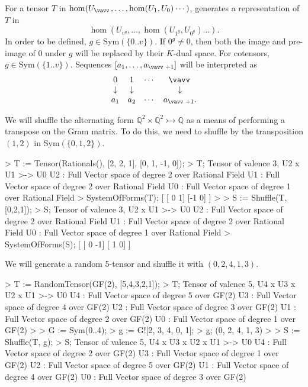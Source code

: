 For a tensor $T$ in $\hom(U_{\vav},\dots,\hom(U_1,U_0)\cdots)$, 
generates a representation of $T$ in 
\[ \hom(U_{v^g},\dots,\hom(U_{1^g},U_{0^g})\dots). \]
In order to be defined, $g\in\text{Sym}(\{0..v\})$. 
If $0^g\ne 0$, then both the image and pre-image of $0$ under $g$ will be replaced by their $K$-dual space.
For cotensors, $g\in\text{Sym}(\{1..v\})$.
Sequences $[a_1,\dots,a_{\vav+1}]$ will be interpreted as 
\[ \begin{array}{cccc} 0 & 1 & \cdots & \vav \\ \downarrow & \downarrow & & \downarrow \\ a_1 & a_2 & \cdots & a_{\vav+1}. \end{array}\]

\begin{example}[ShuffleToTranspose]

We will shuffle the alternating form $\mathbb{Q}^2\times\mathbb{Q}^2\rightarrowtail \mathbb{Q}$ as a means of performing a transpose on the Gram matrix.
To do this, we need to shuffle by the transposition $(1, 2)$ in Sym$(\{0,1,2\})$. 
\begin{code}
> T := Tensor(Rationals(), [2, 2, 1], [0, 1, -1, 0]);
> T;
Tensor of valence 3, U2 x U1 >-> U0
U2 : Full Vector space of degree 2 over Rational Field
U1 : Full Vector space of degree 2 over Rational Field
U0 : Full Vector space of degree 1 over Rational Field
> SystemOfForms(T);
[
    [ 0  1]
    [-1  0]
]
> 
> S := Shuffle(T, [0,2,1]);
> S;
Tensor of valence 3, U2 x U1 >-> U0
U2 : Full Vector space of degree 2 over Rational Field
U1 : Full Vector space of degree 2 over Rational Field
U0 : Full Vector space of degree 1 over Rational Field
> SystemOfForms(S);
[
    [ 0 -1]
    [ 1  0]
]
\end{code}
\end{example}

\begin{example}[Shuffling]

We will generate a random 5-tensor and shuffle it with $(0,2,4,1,3)$.
\begin{code}
> T := RandomTensor(GF(2), [5,4,3,2,1]);
> T;
Tensor of valence 5, U4 x U3 x U2 x U1 >-> U0
U4 : Full Vector space of degree 5 over GF(2)
U3 : Full Vector space of degree 4 over GF(2)
U2 : Full Vector space of degree 3 over GF(2)
U1 : Full Vector space of degree 2 over GF(2)
U0 : Full Vector space of degree 1 over GF(2)
> 
> G := Sym({0..4});
> g := G![2, 3, 4, 0, 1];
> g;
(0, 2, 4, 1, 3)
> 
> S := Shuffle(T, g);
> S;
Tensor of valence 5, U4 x U3 x U2 x U1 >-> U0
U4 : Full Vector space of degree 2 over GF(2)
U3 : Full Vector space of degree 1 over GF(2)
U2 : Full Vector space of degree 5 over GF(2)
U1 : Full Vector space of degree 4 over GF(2)
U0 : Full Vector space of degree 3 over GF(2)
\end{code}
\end{example}




